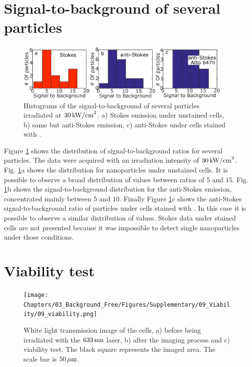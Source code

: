 \section{Signal-to-background of several particles}
\begin{figure}[htp] \centering
\includegraphics[width=0.95\textwidth]{Chapters/03_Background_Free/Figures/Supplementary/08_Histograms_SN/08_histograms.png}
\caption{Histograms of the signal-to-background of several particles irradiated
at $30\,\textrm{kW/cm}^2$. a) Stokes emission under unstained cells, b) same but anti-Stokes
emission, c) anti-Stokes under cells stained with \atto.}
	\label{fig:histograms_SB}
\end{figure}

Figure \ref{fig:histograms_SB} shows the distribution of signal-to-background
ratios for several particles. The data were acquired with an irradiation
intensity of $30\,\textrm{kW/cm}^2$. Fig. \ref{fig:histograms_SB}a shows the distribution for
nanoparticles under unstained cells. It is possible to observe a broad
distribution of values between ratios of $5$ and $15$. Fig.
\ref{fig:histograms_SB}b shows the signal-to-background distribution for the
anti-Stokes emission, concentrated mainly between $5$ and $10$. Finally Figure
\ref{fig:histograms_SB}c shows the anti-Stokes signal-to-background ratio of
particles under cells stained with \atto. In this case it is possible to observe
a similar distribution of values. Stokes data under stained cells are not
presented because it was impossible to detect single nanoparticles under those
conditions. 

\section{Viability test}
\begin{figure}[htp] \centering
\texttt{[image: Chapters/03\_Background\_Free/Figures/Supplementary/09\_Viability/09\_viability.png]}
\caption{White light transmission image of the cells, a) before being
irradiated with the $633\,\textrm{nm}$ laser, b) after the imaging process and c)
viability test. The black square represents the imaged area. The scale bar is
$50\,\mu\textrm{m}$.}
	\label{fig:viability}
\end{figure}


